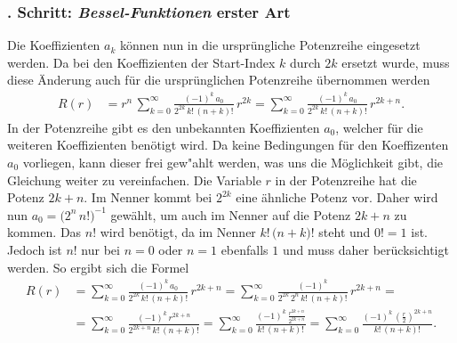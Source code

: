 \subsubsection{. Schritt: \emph{Bessel-Funktionen} erster Art}
Die Koeffizienten $a_k$ k\"onnen nun in die urspr\"ungliche Potenzreihe  eingesetzt werden.
Da bei den Koeffizienten der Start-Index $k$ durch $2k$ ersetzt wurde,
muss diese \"Anderung auch f\"ur die urspr\"unglichen Potenzreihe \"ubernommen werden
\begin{align}
	R \left( r \right)
	&=
	r^{n} \,
	\sum_{k=0}^{\infty}
	\frac
	{
		\left( -1 \right) ^k \, a_0
	}{
		2^{2k} \, {k}! \, {\left( n + k \right)}!
	}
	\, r^{2k}
	=
	\sum_{k=0}^{\infty}
	\frac
	{
		\left( -1 \right) ^k \, a_0
	}{
		2^{2k} \, {k}! \, {\left( n + k \right)}!
	}
	\, r^{2k + n}
	\label{eq:bessel:potenzreihe:koeffizienten:eingesetzt}
	\text{.}
\end{align}
In der Potenzreihe  gibt es den unbekannten Koeffizienten $a_0$,
welcher f\"ur die weiteren Koeffizienten ben\"otigt wird.
Da keine Bedingungen f\"ur den Koeffizenten $a_0$ vorliegen,
kann dieser frei gew"ahlt werden,
was uns die M\"oglichkeit gibt,
die Gleichung  weiter zu vereinfachen.
Die Variable $r$ in der Potenzreihe  hat die Potenz $2k + n$.
Im Nenner kommt bei $2^{2k}$ eine \"ahnliche Potenz vor.
Daher wird nun $a_0 = \big(2^n \, {n}! \big) ^{-1}$ gew\"ahlt,
um auch im Nenner auf die Potenz $2k + n$ zu kommen.
Das ${n}!$ wird ben\"otigt, da im Nenner ${k}! \, { \big( n + k \big) }!$ steht und ${0}! = 1$ ist.
Jedoch ist ${n}!$ nur bei $n = 0$ oder $n = 1$ ebenfalls $1$ und muss daher ber\"ucksichtigt werden.
So ergibt sich die Formel
\begin{align*}
	R \left( r \right)
	&=
	\sum_{k=0}^{\infty}
	\frac
	{
		\left( -1 \right) ^k \, a_0
	}{
		2^{2k} \, {k}! \, {\left( n + k \right)}!
	}
	\, r^{2k + n}
	=
	\sum_{k=0}^{\infty}
	\frac
	{
		\left( -1 \right) ^k
	}{
		2^{2k} \, 2^n \, {k}! \, {\left( n + k \right)}!
	}
	\, r^{2k + n}
	=
	\\
	&=
	\sum_{k=0} ^{\infty}
	\frac
	{
		\left( - 1 \right) ^k \, r ^{2k+n}
	}{
		2^{2k+n} \, {k}! \, { \left( n + k \right) }!
	}
	=
	\sum_{k=0} ^{\infty}
	\frac
	{
		\left( - 1 \right) ^k \, 
		\frac
		{
			r ^{2k+n}
		}{
			2^{2k+n}
		}
	}{
		{k}! \, { \left( n + k \right) }!
	}
	=
	\sum_{k=0} ^{\infty}
	\frac
	{
		\left( - 1 \right) ^k \, 
		\left(		
		\frac
		{
			r
		}{
			2
		} \right) ^{2k+n}
	}{
		{k}! \, { \left( n + k \right) }!
	}
	\text{.}
\end{align*}
